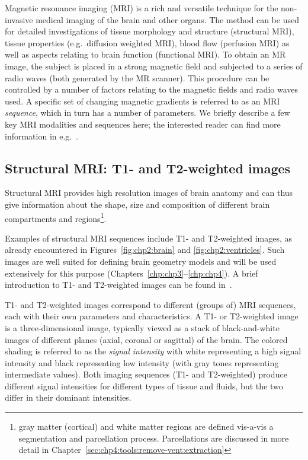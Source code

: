 Magnetic resonance imaging (MRI) is a rich and versatile technique for
the non-invasive medical imaging of the brain and other organs. The method
can be used for detailed investigations of tissue morphology and
structure (structural MRI), tissue properties (e.g.~diffusion weighted MRI),
blood flow (perfusion MRI) as well as aspects relating to brain
function (functional MRI). To obtain an MR image, the subject is
placed in a strong magnetic field and subjected to a series of radio
waves (both generated by the MR scanner). This procedure can be
controlled by a number of factors relating to the magnetic fields and
radio waves used. A specific set of changing magnetic gradients is
referred to as an MRI \emph{sequence}, which in turn has a number of
parameters. We briefly describe a few key MRI modalities and sequences
here; the interested reader can find more information in
e.g.~\cite{haacke1999magnetic, payne2017cerebral, alexander2007diffusion}.

\subsection{Structural MRI: T1- and T2-weighted images}
\label{sec:T1T2}

Structural MRI provides high resolution images of brain anatomy and
can thus give information about the shape, size and composition of
different brain compartments and regions\footnote{gray matter (cortical) and 
white matter regions are defined vis-a-vis a segmentation and 
parcellation process.  Parcellations are discussed in more detail in 
Chapter~\ref{sec:chp4:tools:remove-vent:extraction}}. 

Examples of structural MRI
sequences include T1- and T2-weighted images, as already
encountered in Figures~\ref{fig:chp2:brain} and
\ref{fig:chp2:ventricles}. Such images are well suited for defining
brain geometry models and will be used extensively for this purpose
(Chapters~\ref{chp:chp3}--\ref{chp:chp4}). A brief introduction to T1-
and T2-weighted images can be found in~\cite{pooley2005fundamental}.

T1- and T2-weighted images correspond to different (groups of) MRI
sequences, each with their own parameters and characteristics. A T1-
or T2-weighted image is a three-dimensional image, typically viewed as
a stack of black-and-white images of different planes (axial, coronal
or sagittal) of the brain. The colored shading is referred to as the
\emph{signal intensity} with white representing a high signal
intensity and black representing low intensity (with gray tones
representing intermediate values). Both imaging sequences (T1- and
T2-weighted) produce different signal intensities for different types of
tissue and fluids, but the two differ in their dominant intensities.

